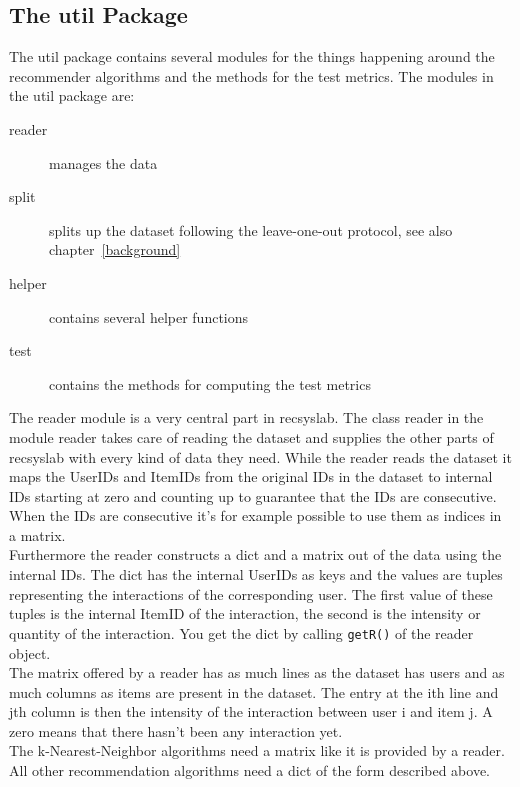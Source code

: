 \subsection*{The util Package}
The util package contains several modules for the things happening around the 
recommender algorithms and the methods for the test metrics.
The modules in the util package are:
\begin{description}
\item[reader] manages the data
\item[split] splits up the dataset following the leave-one-out protocol, see also chapter~\ref{background}
\item[helper] contains several helper functions
\item[test] contains the methods for computing the test metrics
\end{description}
The reader module is a very central part in recsyslab.
The class reader in the module reader takes care of reading the dataset and 
supplies the other parts of recsyslab with every kind of data they need.
While the reader reads the dataset it maps the UserIDs and 
ItemIDs from the original IDs in the dataset to internal IDs 
starting at zero and counting up to guarantee that the IDs are consecutive. 
When the IDs are consecutive it's for example possible to use them as
indices in a matrix. \\
Furthermore the reader constructs a dict and a matrix
out of the data using the internal IDs. The dict has the internal 
UserIDs as keys and the values are tuples representing the 
interactions of the corresponding user. The first value of these tuples is the internal
ItemID of the interaction, the second is the intensity or
quantity of the interaction. You get the dict by calling \lstinline!getR()!
of the reader object. \\
The matrix offered by a reader has as much lines as the dataset
has users and as much columns as items are present in the dataset.
The entry at the ith line and jth column is then the intensity of the interaction
between user i and item j. A zero means that there hasn't been any
interaction yet.\\
The k-Nearest-Neighbor algorithms need a matrix like it is provided by a
reader. All other recommendation algorithms need a dict of the 
form described above.


